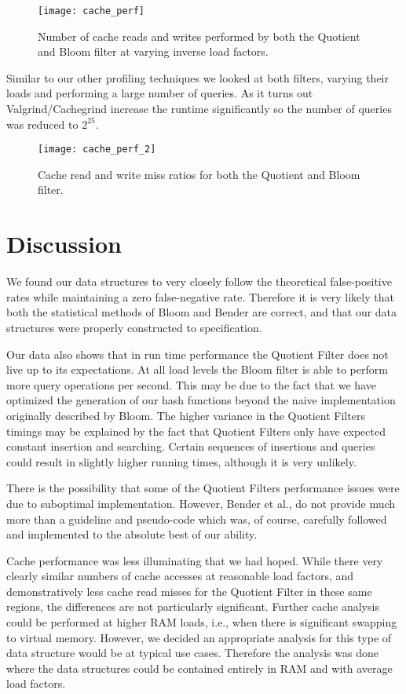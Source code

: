 \documentclass[twoside]{article}
\begin{document}
\begin{figure}[!htb]
\centering
	\texttt{[image: cache\_perf]}
	\caption{Number of cache reads and writes performed by both the Quotient and Bloom filter at varying inverse load factors.}
\end{figure}

Similar to our other profiling techniques we looked at both filters, varying their loads and performing a large number of queries. As it turns out Valgrind/Cachegrind increase the runtime significantly so the number of queries was reduced to $2^{25}$.

\begin{figure}[!htb]
\centering
	\texttt{[image: cache\_perf\_2]}
	\caption{Cache read and write miss ratios for both the Quotient and Bloom filter.}
\end{figure}


\section{Discussion}
We found our data structures to very closely follow the theoretical false-positive rates while maintaining a zero false-negative rate. Therefore it is very likely that both the statistical methods of Bloom and Bender are correct, and that our data structures were properly constructed to specification.

Our data also shows that in run time performance the Quotient Filter does not live up to its expectations. At all load levels the Bloom filter is able to perform more query operations per second. This may be due to the fact that we have optimized the generation of our hash functions beyond the naive implementation originally described by Bloom. The higher variance in the Quotient Filters timings may be explained by the fact that Quotient Filters only have expected constant insertion and searching. Certain sequences of insertions and queries could result in slightly higher running times, although it is very unlikely.

There is the possibility that some of the Quotient Filters performance issues were due to suboptimal implementation. However, Bender et al., \cite{bender} do not provide much more than a guideline and pseudo-code which was, of course, carefully followed and implemented to the absolute best of our ability. 

Cache performance was less illuminating that we had hoped. While there very clearly similar numbers of cache accesses at reasonable load factors, and demonstratively less cache read misses for the Quotient Filter in these same regions, the differences are not particularly significant. Further cache analysis could be performed at higher RAM loads, i.e., when there is significant swapping to virtual memory. However, we decided an appropriate analysis for this type of data structure would be at typical use cases. Therefore the analysis was done where the data structures could be contained entirely in RAM and with average load factors.
\end{document}
